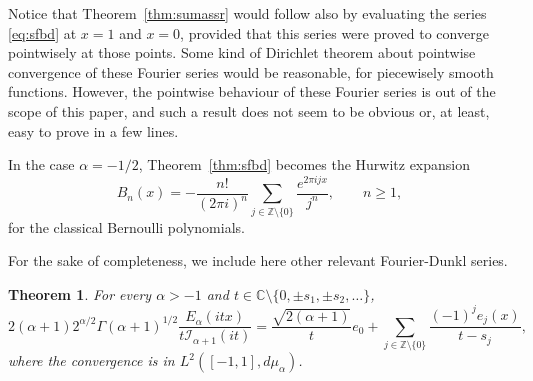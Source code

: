 \documentclass[10pt,a4paper]{article}
\theoremstyle{plain}
\newtheorem{theorem}{Theorem}[section]
\theoremstyle{definition}
\numberwithin{equation}{section} %
\newcommand{\Ea}{E_{\alpha}}
\newcommand{\mua}{\mu_{\alpha}}
\newcommand{\I}{\mathcal{I}}
\newcommand{\CC}{\mathbb{C}}
\newcommand{\ZZO}{\mathbb{Z} \setminus \{0\}}
\begin{document}
Notice that Theorem~\ref{thm:sumassr} would follow also by evaluating the series \eqref{eq:sfbd} at $x=1$ and $x=0$, provided that this series were proved to converge pointwisely at those points.
Some kind of Dirichlet theorem about pointwise convergence of these Fourier series would be reasonable, for piecewisely smooth functions. However, the pointwise behaviour of these Fourier series is out of the scope of this paper, and such a result does not seem to be obvious or, at least, easy to prove in a few lines.

In the case $\alpha=-1/2$, Theorem~\ref{thm:sfbd} becomes the Hurwitz expansion
\[
  B_n(x) = -\frac{n!}{(2\pi i)^n} \sum_{j\in \ZZO} \frac{e^{2\pi i j x}}{j^n},
  \qquad n \ge 1,
\]
for the classical Bernoulli polynomials.

For the sake of completeness, we include here other relevant Fourier-Dunkl series.

\begin{theorem}
For every $\alpha>-1$ and $t\in \CC\setminus \{0,\pm s_1,\pm s_2,\dots\}$,
\begin{equation}
\label{eq:sfeatx}
  2(\alpha+1)2^{\alpha/2}\Gamma(\alpha+1)^{1/2} \frac{\Ea(itx)}{t\I_{\alpha+1}(it)}
  = \frac{\sqrt{2(\alpha+1)}}{t}e_0
  + \sum_{j\in \ZZO} \frac{(-1)^je_j(x)}{t-s_j},
\end{equation}
where the convergence is in $L^2([-1,1],d\mua)$.
\end{theorem}
\end{document}
